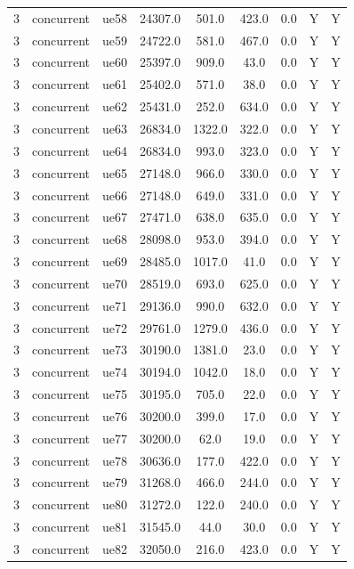 \begin{table}[ht]
\begin{tabular}{|c|c|c|c|c|c|c|c|c|}
3 & concurrent & ue58 & 24307.0 & 501.0 & 423.0 & 0.0 & Y & Y \\
3 & concurrent & ue59 & 24722.0 & 581.0 & 467.0 & 0.0 & Y & Y \\
3 & concurrent & ue60 & 25397.0 & 909.0 & 43.0 & 0.0 & Y & Y \\
3 & concurrent & ue61 & 25402.0 & 571.0 & 38.0 & 0.0 & Y & Y \\
3 & concurrent & ue62 & 25431.0 & 252.0 & 634.0 & 0.0 & Y & Y \\
3 & concurrent & ue63 & 26834.0 & 1322.0 & 322.0 & 0.0 & Y & Y \\
3 & concurrent & ue64 & 26834.0 & 993.0 & 323.0 & 0.0 & Y & Y \\
3 & concurrent & ue65 & 27148.0 & 966.0 & 330.0 & 0.0 & Y & Y \\
3 & concurrent & ue66 & 27148.0 & 649.0 & 331.0 & 0.0 & Y & Y \\
3 & concurrent & ue67 & 27471.0 & 638.0 & 635.0 & 0.0 & Y & Y \\
3 & concurrent & ue68 & 28098.0 & 953.0 & 394.0 & 0.0 & Y & Y \\
3 & concurrent & ue69 & 28485.0 & 1017.0 & 41.0 & 0.0 & Y & Y \\
3 & concurrent & ue70 & 28519.0 & 693.0 & 625.0 & 0.0 & Y & Y \\
3 & concurrent & ue71 & 29136.0 & 990.0 & 632.0 & 0.0 & Y & Y \\
3 & concurrent & ue72 & 29761.0 & 1279.0 & 436.0 & 0.0 & Y & Y \\
3 & concurrent & ue73 & 30190.0 & 1381.0 & 23.0 & 0.0 & Y & Y \\
3 & concurrent & ue74 & 30194.0 & 1042.0 & 18.0 & 0.0 & Y & Y \\
3 & concurrent & ue75 & 30195.0 & 705.0 & 22.0 & 0.0 & Y & Y \\
3 & concurrent & ue76 & 30200.0 & 399.0 & 17.0 & 0.0 & Y & Y \\
3 & concurrent & ue77 & 30200.0 & 62.0 & 19.0 & 0.0 & Y & Y \\
3 & concurrent & ue78 & 30636.0 & 177.0 & 422.0 & 0.0 & Y & Y \\
3 & concurrent & ue79 & 31268.0 & 466.0 & 244.0 & 0.0 & Y & Y \\
3 & concurrent & ue80 & 31272.0 & 122.0 & 240.0 & 0.0 & Y & Y \\
3 & concurrent & ue81 & 31545.0 & 44.0 & 30.0 & 0.0 & Y & Y \\
3 & concurrent & ue82 & 32050.0 & 216.0 & 423.0 & 0.0 & Y & Y \\

\end{tabular}
\end{table}
